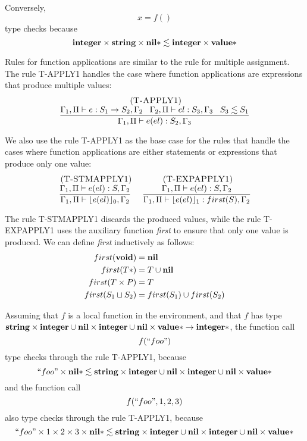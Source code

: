 Conversely,
\[
x = f()
\]
type checks because
\[
\mathbf{integer} \times \mathbf{string} \times \mathbf{nil}{*} \lesssim \mathbf{integer} \times \mathbf{value}{*}
\]

Rules for function applications are similar to the rule for multiple assignment.
The rule \textsc{T-APPLY1} handles the case where function applications
are expressions that produce multiple values:
\[
\begin{array}{c}
\; (\textsc{T-APPLY1})\\
\dfrac{\Gamma_{1}, \Pi \vdash e:S_{1} \rightarrow S_{2}, \Gamma_{2} \;\;\;
       \Gamma_{2}, \Pi \vdash el:S_{3}, \Gamma_{3} \;\;\;
       S_{3} \lesssim S_{1}}
      {\Gamma_{1}, \Pi \vdash e(el):S_{2}, \Gamma_{3}}
\end{array}
\]

We also use the rule \textsc{T-APPLY1} as the base case for the rules
that handle the cases where function applications are either statements
or expressions that produce only one value:
\[
\begin{array}{c}
\begin{array}{c}
\; (\textsc{T-STMAPPLY1})\\
\dfrac{\Gamma_{1}, \Pi \vdash e(el):S, \Gamma_{2}}
      {\Gamma_{1}, \Pi \vdash \lfloor e(el) \rfloor_{0},\Gamma_{2}}
\end{array}
\;
\begin{array}{c}
\; (\textsc{T-EXPAPPLY1})\\
\dfrac{\Gamma_{1}, \Pi \vdash e(el):S, \Gamma_{2}}
      {\Gamma_{1}, \Pi \vdash \lfloor e(el) \rfloor_{1}:first(S), \Gamma_{2}}
\end{array}
\end{array}
\]

The rule \textsc{T-STMAPPLY1} discards the produced values,
while the rule \textsc{T-EXPAPPLY1} uses the auxiliary function
\emph{first} to ensure that only one value is produced.
We can define \emph{first} inductively as follows:
\begin{align*}
first(\mathbf{void}) & = \mathbf{nil}\\
first(T{*}) & = T \cup \mathbf{nil}\\
first(T \times P) & = T\\
first(S_{1} \sqcup S_{2}) & = first(S_{1}) \cup first(S_{2})
\end{align*}

Assuming that $f$ is a local function in the environment, and that $f$ has type
$\mathbf{string} \times \mathbf{integer} \cup \mathbf{nil} \times \mathbf{integer} \cup \mathbf{nil} \times \mathbf{value}{*} \rightarrow \mathbf{integer}{*}$,
the function call
\[
f(``foo")
\]
type checks through the rule \textsc{T-APPLY1}, because
\[
``foo" \times \mathbf{nil}{*} \lesssim \mathbf{string} \times \mathbf{integer} \cup \mathbf{nil} \times \mathbf{integer} \cup \mathbf{nil} \times \mathbf{value}{*}
\]
and the function call
\[
f(``foo",1,2,3)
\]
also type checks through the rule \textsc{T-APPLY1}, because
\[
``foo" \times 1 \times 2 \times 3 \times \mathbf{nil}{*} \lesssim \mathbf{string} \times \mathbf{integer} \cup \mathbf{nil} \times \mathbf{integer} \cup \mathbf{nil} \times \mathbf{value}{*}
\]

